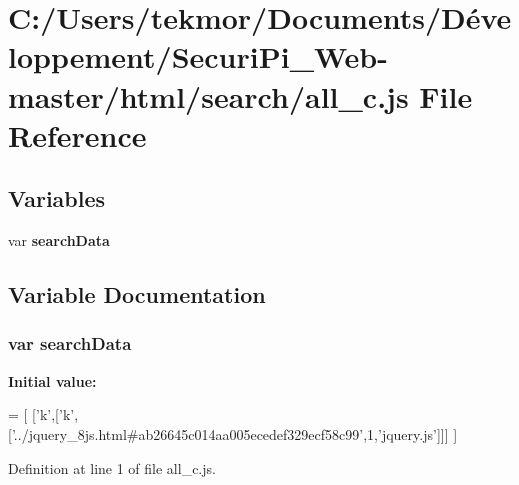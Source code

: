 \section{C\+:/\+Users/tekmor/\+Documents/\+Développement/\+Securi\+Pi\+\_\+\+Web-\/master/html/search/all\+\_\+c.js File Reference}
\label{all__c_8js}
\subsection*{Variables}
\begin{DoxyCompactItemize}
\item 
var {\bf search\+Data}
\end{DoxyCompactItemize}


\subsection{Variable Documentation}
\subsubsection[{search\+Data}]{\setlength{\rightskip}{0pt plus 5cm}var search\+Data}\label{all__c_8js_ad01a7523f103d6242ef9b0451861231e}
{\bfseries Initial value\+:}
\begin{DoxyCode}
=
[
  [\textcolor{charliteral}{'k'},[\textcolor{charliteral}{'k'},[\textcolor{stringliteral}{'../jquery\_8js.html#ab26645c014aa005ecedef329ecf58c99'},1,\textcolor{stringliteral}{'jquery.js'}]]]
]
\end{DoxyCode}


Definition at line 1 of file all\+\_\+c.\+js.

